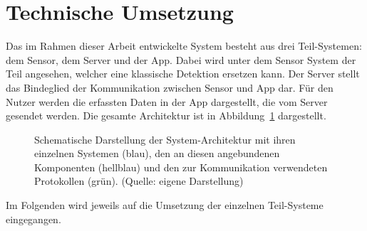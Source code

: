 \section{Technische Umsetzung}\label{ch:Umsetzung}
Das im Rahmen dieser Arbeit entwickelte System besteht aus drei Teil-Systemen: dem Sensor, dem Server und der App.
Dabei wird unter dem Sensor System der Teil angesehen, welcher eine klassische Detektion ersetzen kann.
Der Server stellt das Bindeglied der Kommunikation zwischen Sensor und App dar.
Für den Nutzer werden die erfassten Daten in der App dargestellt, die vom Server gesendet werden.
Die gesamte Architektur ist in Abbildung~\ref{fig:Architektur} dargestellt.

\begin{figure}[h]
	\myImagePos{}
	
	\caption[Schematische Darstellung der System-Architektur]{Schematische Darstellung der System-Architektur mit ihren einzelnen Systemen (blau), den an diesen angebundenen Komponenten (hellblau) und den zur Kommunikation verwendeten Protokollen (grün). (Quelle: eigene Darstellung)}
	\label{fig:Architektur}
\end{figure}

Im Folgenden wird jeweils auf die Umsetzung der einzelnen Teil-Systeme eingegangen.




